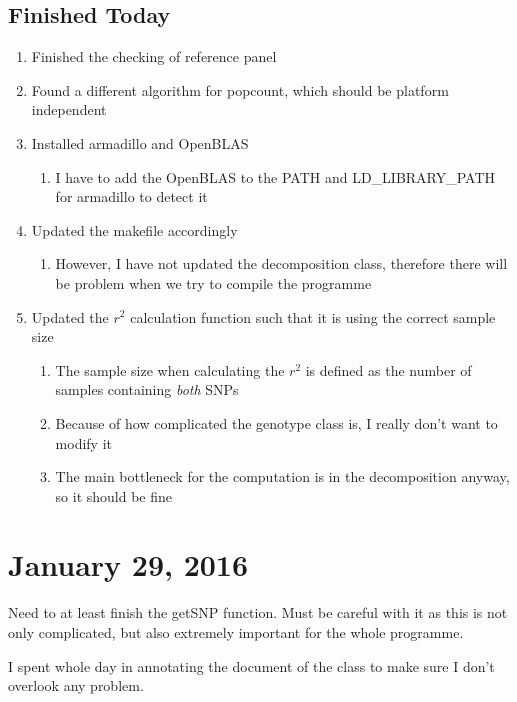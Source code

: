 \documentclass[12pt]{article}
\begin{document}
	\subsection{Finished Today}
	\begin{enumerate}
		\item Finished the checking of reference panel
		\item Found a different algorithm for popcount, which should be platform independent
		\item Installed armadillo and OpenBLAS
		\begin{enumerate}
			\item I have to add the OpenBLAS to the PATH and LD\_LIBRARY\_PATH for armadillo to detect it
		\end{enumerate}
		\item Updated the makefile accordingly
		\begin{enumerate}
			\item However, I have not updated the decomposition class, therefore there will be problem when we try to compile the programme
		\end{enumerate}
		\item Updated the $r^2$ calculation function such that it is using the correct sample size
		\begin{enumerate}
			\item The sample size when calculating the $r^2$ is defined as the number of samples containing \emph{both} SNPs
			\item Because of how complicated the genotype class is, I really don't want to modify it
			\item The main bottleneck for the computation is in the decomposition anyway, so it should be fine
		\end{enumerate}
		
	\end{enumerate}
	
	\section{January 29, 2016}
	Need to at least finish the getSNP function.
	Must be careful with it as this is not only complicated, but also extremely important for the whole programme.
	
	I spent whole day in annotating the document of the class to make sure I don't overlook any problem.
	
\end{document}
